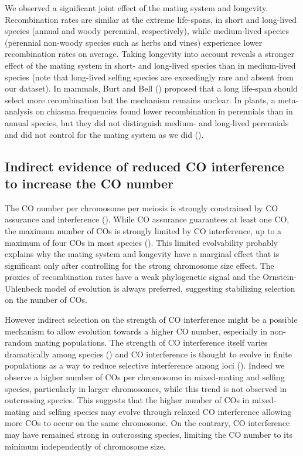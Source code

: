 \documentclass{article}
\begin{document}
We observed a significant joint effect of the mating system and longevity. Recombination rates are similar at the extreme life-spans, in short and long-lived species (annual and woody perennial, respectively), while medium-lived species (perennial non-woody species such as herbs and vines) experience lower recombination rates on average. Taking longevity into account reveals a stronger effect of the mating system in short- and long-lived species than in medium-lived species (note that long-lived selfing species are exceedingly rare and absent from our dataset). In mammals, Burt and Bell (\cite{burtMammalianChiasmaFrequencies1987}) proposed that a long life-span should select more recombination but the mechanism remains unclear. In plants, a meta-analysis on chiasma frequencies found lower recombination in perennials than in annual species, but they did not distinguish medium- and long-lived perennials and did not control for the mating system as we did (\cite{koellaEcologicalCorrelatesChiasma1993}).


\subsection*{Indirect evidence of reduced CO interference to increase the CO number}


The CO number per chromosome per meiosis is strongly constrained by CO assurance and interference (\cite{wangMeioticCrossoverPatterns2015}). While CO assurance guarantees at least one CO, the maximum number of COs is strongly limited by CO interference, up to a maximum of four COs in most species (\cite{brazierDiversityDeterminantsRecombination2022b,stapleyVariationRecombinationFrequency2017}). This limited evolvability probably explains why the mating system and longevity have a marginal effect that is significant only after controlling for the strong chromosome size effect. The proxies of recombination rates have a weak phylogenetic signal and the Ornstein-Uhlenbeck model of evolution is always preferred, suggesting stabilizing selection on the number of COs.


However indirect selection on the strength of CO interference might be a possible mechanism to allow evolution towards a higher CO number, especially in non-random mating populations. The strength of CO interference itself varies dramatically among species (\cite{ottoCrossoverInterferenceShedding2019}) and CO interference is thought to evolve in finite populations as a way to reduce selective interference among loci (\cite{barton2005evolution,keightley2006interference,roze2006hill}). Indeed we observe a higher number of COs per chromosome in mixed-mating and selfing species, particularly in larger chromosomes, while this trend is not observed in outcrossing species. This suggests that the higher number of COs in mixed-mating and selfing species may evolve through relaxed CO interference allowing more COs to occur on the same chromosome. On the contrary, CO interference may have remained strong in outcrossing species, limiting the CO number to its minimum independently of chromosome size.
\end{document}
